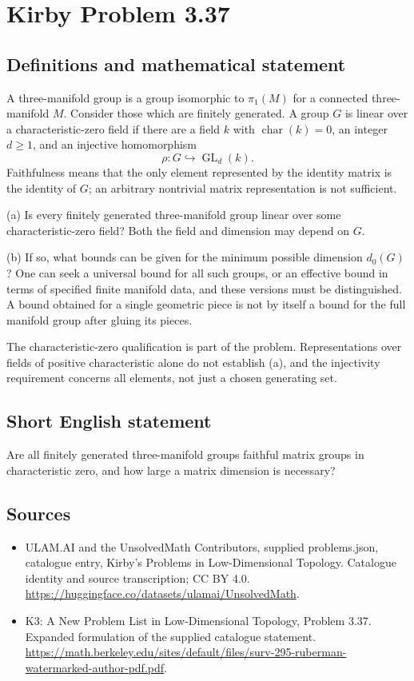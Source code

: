 \documentclass[11pt,a4paper]{article}
\begin{document}
\section*{Kirby Problem 3.37}\label{statement}

\subsection{Definitions and mathematical statement}
A three-manifold group is a group isomorphic to $\pi_1(M)$ for a connected
three-manifold $M$. Consider those which are finitely generated. A group
$G$ is linear over a characteristic-zero field if there are a field $k$
with $\operatorname{char}(k)=0$, an integer $d\geq1$, and an injective
homomorphism
\[
 \rho:G\hookrightarrow\operatorname{GL}_d(k).
\]
Faithfulness means that the only element represented by the identity matrix
is the identity of $G$; an arbitrary nontrivial matrix representation is
not sufficient.

(a) Is every finitely generated three-manifold group linear over some
characteristic-zero field? Both the field and dimension may depend on $G$.

(b) If so, what bounds can be given for the minimum possible dimension
$d_0(G)$? One can seek a universal bound for all such groups, or an effective
bound in terms of specified finite manifold data, and these versions must
be distinguished. A bound obtained for a single geometric piece is not by
itself a bound for the full manifold group after gluing its pieces.

The characteristic-zero qualification is part of the problem. Representations
over fields of positive characteristic alone do not establish (a), and the
injectivity requirement concerns all elements, not just a chosen generating set.
\subsection{Short English statement}
Are all finitely generated three-manifold groups faithful matrix groups in characteristic zero, and how large a matrix dimension is necessary?
\subsection{Sources}
\begin{itemize}
\item[S1] ULAM.AI and the UnsolvedMath Contributors, supplied problems.json, catalogue entry, Kirby's Problems in Low-Dimensional Topology. Catalogue identity and source transcription; CC BY 4.0.
\url{https://huggingface.co/datasets/ulamai/UnsolvedMath}.
\item[S2] K3: A New Problem List in Low-Dimensional Topology, Problem 3.37. Expanded formulation of the supplied catalogue statement.
\url{https://math.berkeley.edu/sites/default/files/surv-295-ruberman-watermarked-author-pdf.pdf}.
\end{itemize}
\end{document}

